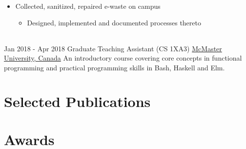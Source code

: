 \documentclass[letterpaper]{twentysecondcv} %
\begin{document}
\begin{twenty}
{\begin{itemize}
      \item Collected, sanitized, repaired e-waste on campus
      \begin{itemize}
        \item Designed, implemented and documented processes thereto
      \end{itemize}
    \end{itemize}
  }
  \\
  \twentyitem
  {Jan 2018 -}
  {Apr 2018}
  {Graduate Teaching Assistant (CS 1XA3)}
  {\href{https://www.mcmaster.ca/}{McMaster University, Canada}}
  {}
  {An introductory course covering core concepts in functional programming and practical programming skills in Bash, Haskell and Elm.
}
\end{twenty}
\section{Selected Publications}
\vspace{-.5em}
\printbibliography[heading=none]
\section{Awards}
\end{document}
